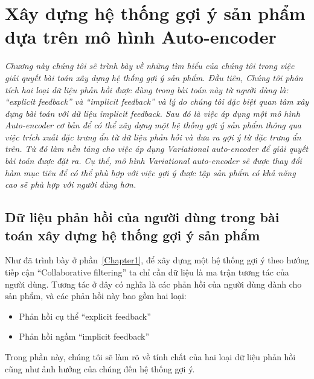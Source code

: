 \chapter{Xây dựng hệ thống gợi ý sản phẩm dựa trên mô hình Auto-encoder}
\label{Chapter3}
\textit{Chương này chúng tôi sẽ trình bày về những tìm hiểu của chúng tôi trong việc giải quyết bài toán xây dựng hệ thống gợi ý sản phẩm. 
Đầu tiên, Chúng tôi phân tích hai loại dữ liệu phản hồi được dùng trong bài toán này từ người dùng là:
``explicit feedback'' và ``implicit feedback'' và lý do chúng tôi đặc biệt quan tâm xây dựng bài toán với dữ liệu implicit feedback.
Sau đó là việc áp dụng một mô hình Auto-encoder cơ bản để có thể xây dựng một hệ thống gợi ý sản phẩm thông qua việc trích xuất đặc trưng ẩn từ dữ liệu phản hồi và đưa ra gợi ý từ đặc trưng ẩn trên. Từ đó làm nền tảng cho việc áp dụng Variational auto-encoder để giải quyết bài toán được đặt ra. Cụ thể, mô hình Variational auto-encoder sẽ được thay đổi hàm mục tiêu để có thể phù hợp với việc gợi ý được tập sản phẩm có khả năng cao sẽ phù hợp với người dùng hơn.}


\section{Dữ liệu phản hồi của người dùng trong bài toán xây dựng hệ thống gợi ý sản phẩm}
    Như đã trình bày ở phần~\ref{Chapter1}, để xây dựng một hệ thống gợi ý 
    theo hướng tiếp cận ``Collaborative filtering'' ta chỉ cần dữ liệu là ma trận tương tác của người dùng.
    Tương tác ở đây có nghĩa là các phản hồi của người dùng dành cho sản phẩm, và các phản hồi này bao gồm hai loại:
    \begin{itemize}
        \item Phản hồi cụ thể ``explicit feedback''
        \item Phản hồi ngầm ``implicit feedback''
    \end{itemize}
    Trong phần này, chúng tôi sẽ làm rõ về tính chất của hai loại dữ liệu phản hồi cũng như ảnh hưởng của chúng đến hệ thống gợi ý.
